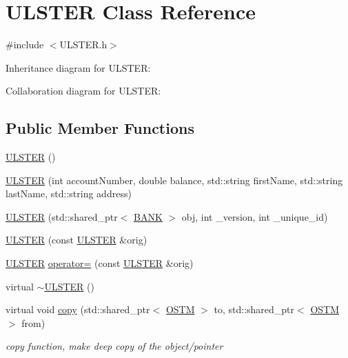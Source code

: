 \hypertarget{class_u_l_s_t_e_r}{}\section{U\+L\+S\+T\+ER Class Reference}
\label{class_u_l_s_t_e_r}


{\ttfamily \#include $<$U\+L\+S\+T\+E\+R.\+h$>$}



Inheritance diagram for U\+L\+S\+T\+ER\+:


Collaboration diagram for U\+L\+S\+T\+ER\+:
\subsection*{Public Member Functions}
\begin{DoxyCompactItemize}
\item 
\hyperlink{class_u_l_s_t_e_r_a637ad8cb5537167ab51cd079637a8323}{U\+L\+S\+T\+ER} ()
\item 
\hyperlink{class_u_l_s_t_e_r_ad80944864d4f907dd30b02a1d1a563cc}{U\+L\+S\+T\+ER} (int account\+Number, double balance, std\+::string first\+Name, std\+::string last\+Name, std\+::string address)
\item 
\hyperlink{class_u_l_s_t_e_r_ac7207ca64f86ef3081e176deb222805d}{U\+L\+S\+T\+ER} (std\+::shared\+\_\+ptr$<$ \hyperlink{class_b_a_n_k}{B\+A\+NK} $>$ obj, int \+\_\+version, int \+\_\+unique\+\_\+id)
\item 
\hyperlink{class_u_l_s_t_e_r_ad8847497742850609cd4748bbb6d0a8e}{U\+L\+S\+T\+ER} (const \hyperlink{class_u_l_s_t_e_r}{U\+L\+S\+T\+ER} \&orig)
\item 
\hyperlink{class_u_l_s_t_e_r}{U\+L\+S\+T\+ER} \hyperlink{class_u_l_s_t_e_r_aa096fc13a27cf4c4238af3aad8382a13}{operator=} (const \hyperlink{class_u_l_s_t_e_r}{U\+L\+S\+T\+ER} \&orig)
\item 
virtual \hyperlink{class_u_l_s_t_e_r_a4ceb68bdbc806f74f9e55096f8223453}{$\sim$\+U\+L\+S\+T\+ER} ()
\item 
virtual void \hyperlink{class_u_l_s_t_e_r_aeef5c3e20f2a82344b4b83e5ccf4cc40}{copy} (std\+::shared\+\_\+ptr$<$ \hyperlink{class_o_s_t_m}{O\+S\+TM} $>$ to, std\+::shared\+\_\+ptr$<$ \hyperlink{class_o_s_t_m}{O\+S\+TM} $>$ from)
\begin{DoxyCompactList}\small\item\em copy function, make deep copy of the object/pointer \end{DoxyCompactList}\item 

\end{DoxyCompactItemize}
